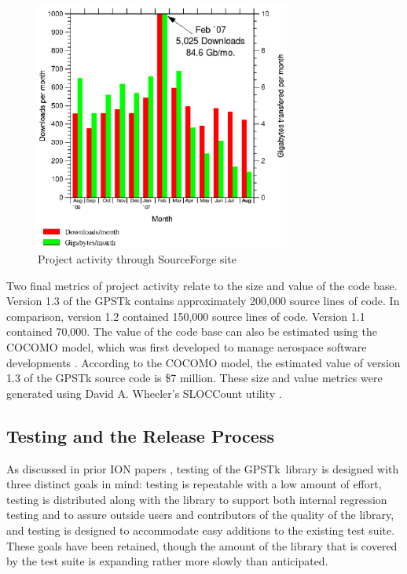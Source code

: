 \documentclass[letterpaper,ugly,10pt]{ion-gps}
\begin{document}
%
\begin{figure}
	\centering
	\includegraphics[bb=0 0 402 389,width=3.3in]{sfdownloadstouched.eps}
	\caption{Project activity through SourceForge site}
	\label{fig:sfactivity}
\end{figure}

Two final metrics of project activity relate to the size and value of the code base. Version 1.3 of the GPSTk contains approximately 200,000 source lines of code. In comparison, version 1.2 contained 150,000 source lines of code. Version 1.1 contained 70,000. The value of the code base can also be estimated using the COCOMO model, which was first developed to manage aerospace software developments \cite{cocomomodel}. According to the COCOMO model, the estimated value of version 1.3 of the GPSTk source code is \$7 million. These size and value metrics were generated using David A. Wheeler's SLOCCount utility \cite{sloccount}.

\subsection*{Testing and the Release Process}

As discussed in prior ION papers \cite{ion:gnss06}, testing of the \mbox{GPSTk library} is designed with three distinct goals in mind: testing is repeatable with a low amount of effort, testing is distributed along with the library to support both internal regression testing and to assure outside users and contributors of the quality of the library, and testing is designed to accommodate easy additions to the existing test suite.  These goals have been retained, though the amount of the library that is covered by the test suite is expanding rather more slowly than anticipated. 
\end{document}

